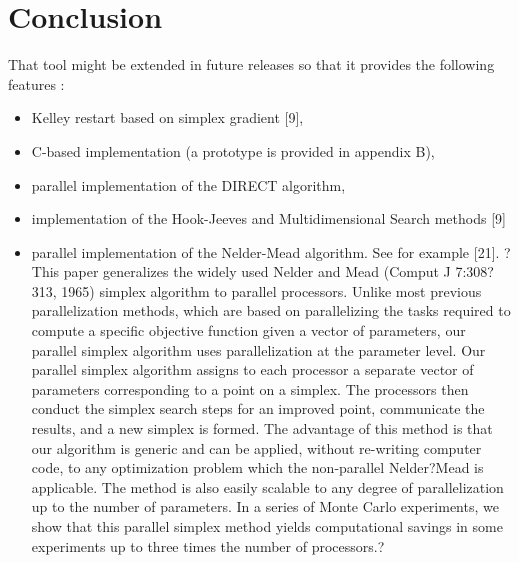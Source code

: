 \chapter{Conclusion}

That tool might be extended in future releases so that it provides the following features :
\begin{itemize}
\item Kelley restart based on simplex gradient [9],
\item C-based implementation (a prototype is provided in appendix B),
\item parallel implementation of the DIRECT algorithm,
\item implementation of the Hook-Jeeves and Multidimensional Search methods [9]
\item parallel implementation of the Nelder-Mead algorithm. See for example [21]. 
?This paper generalizes the widely used Nelder and Mead (Comput J 
7:308?313, 1965) simplex algorithm to parallel processors. Unlike most 
previous parallelization methods, which are based on parallelizing the 
tasks required to compute a specific objective function given a vector 
of parameters, our parallel simplex algorithm uses parallelization at 
the parameter level. Our parallel simplex algorithm assigns to each 
processor a separate vector of parameters corresponding to a point on a 
simplex. The processors then conduct the simplex search steps for an 
improved point, communicate the results, and a new simplex is formed. 
The advantage of this method is that our algorithm is generic and can be 
applied, without re-writing computer code, to any optimization problem 
which the non-parallel Nelder?Mead is applicable. The method is also 
easily scalable to any degree of parallelization up to the number of 
parameters. In a series of Monte Carlo experiments, we show that this 
parallel simplex method yields computational savings in some experiments 
up to three times the number of processors.?
\end{itemize}

